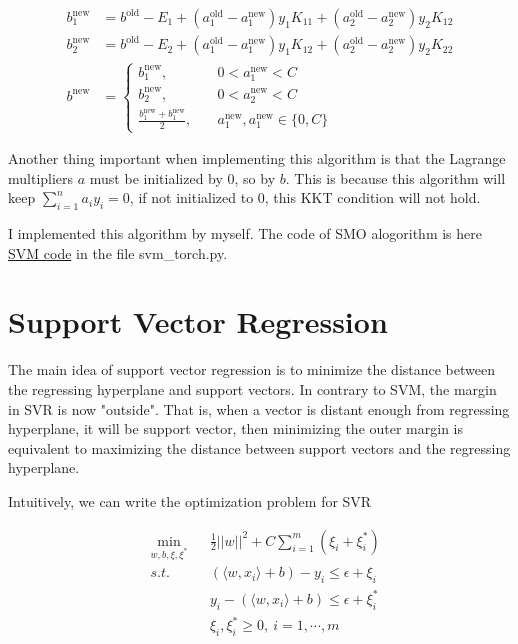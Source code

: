 \documentclass[a4paper]{report}
\begin{document}
\begin{align*}
    b_1^{\mathrm{new}} &= b^{\mathrm{old}} - E_1 + (a_1^{\mathrm{old}}-a_1^{\mathrm{new}})y_1 K_{11} + (a_2^{\mathrm{old}}-a_2^{\mathrm{new}})y_2 K_{12} \\
    b_2^{\mathrm{new}} &= b^{\mathrm{old}} - E_2 + (a_1^{\mathrm{old}}-a_1^{\mathrm{new}})y_1 K_{12} + (a_2^{\mathrm{old}}-a_2^{\mathrm{new}})y_2 K_{22} \\
    b^{\mathrm{new}}&= 
    \begin{cases}
        b_1^{\mathrm{new}}, \quad &0<a_1^{\mathrm{new}}<C \\
        b_2^{\mathrm{new}}, \quad &0<a_2^{\mathrm{new}}<C \\
        \frac{b_1^{\mathrm{new}}+b_1^{\mathrm{new}}}{2}, \quad &a_1^{\mathrm{new}},a_1^{\mathrm{new}}\in \{0,C\} 
    \end{cases}
\end{align*}

Another thing important when implementing this algorithm is that the Lagrange multipliers $a$ must be initialized by 0, so by $b$. This is because this algorithm will keep $\sum_{i=1}^n a_i y_i = 0$, if not initialized to 0, this KKT condition will not hold.

I implemented this algorithm by myself. The code of SMO alogorithm is here \href{https://github.com/chaihahaha/Multiclass-Support-Vector-Machine-Tensorflow}{SVM code} in the file svm\_torch.py.


\section{Support Vector Regression}

The main idea of support vector regression\cite{drucker1997support} is to minimize the distance between the regressing hyperplane and support vectors. In contrary to SVM, the margin in SVR is now "outside". That is, when a vector is distant enough from regressing hyperplane, it will be support vector, then minimizing the outer margin is equivalent to maximizing the distance between support vectors and the regressing hyperplane.

Intuitively, we can write the optimization problem for SVR

\begin{align*}
    &\min_{w,b,\xi, \xi^*} && \frac{1}{2}||w||^2 +C\sum_{i=1}^m (\xi_i+\xi_i^*) \\
    &s.t. && (\langle w,x_i\rangle +b)-y_i\leq \epsilon +\xi_i \\
    & && y_i-(\langle w,x_i\rangle +b)\leq \epsilon +\xi_i^* \\
    & && \xi_i,\xi_i^*\geq 0,\ i=1,\cdots,m
\end{align*}
\end{document}

